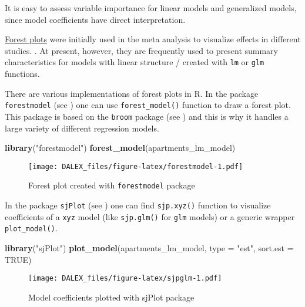 \documentclass[]{book}
\newenvironment{Shaded}{\begin{snugshade}}{\end{snugshade}}
\newcommand{\DataTypeTok}[1]{\textcolor[rgb]{0.13,0.29,0.53}{#1}}
\newcommand{\KeywordTok}[1]{\textcolor[rgb]{0.13,0.29,0.53}{\textbf{#1}}}
\newcommand{\NormalTok}[1]{#1}
\newcommand{\OtherTok}[1]{\textcolor[rgb]{0.56,0.35,0.01}{#1}}
\newcommand{\StringTok}[1]{\textcolor[rgb]{0.31,0.60,0.02}{#1}}
\theoremstyle{definition}
\theoremstyle{definition}
\theoremstyle{definition}
\theoremstyle{remark}
\begin{document}
It is easy to assess variable importance for linear models and
generalized models, since model coefficients have direct interpretation.

\href{https://en.wikipedia.org/wiki/Forest_plot}{Forest plots} were
initially used in the meta analysis to visualize effects in different
studies. . At present, however, they are frequently used to present
summary characteristics for models with linear structure / created with
\texttt{lm} or \texttt{glm} functions.

There are various implementations of forest plots in R. In the package
\texttt{forestmodel} (see \citep{forestmodel}) one can use
\texttt{forest\_model()} function to draw a forest plot. This package is
based on the \texttt{broom} package (see \citep{broom}) and this is why
it handles a large variety of different regression models.

\begin{Shaded}
\begin{Highlighting}[]
\KeywordTok{library}\NormalTok{(}\StringTok{"forestmodel"}\NormalTok{)}
\KeywordTok{forest_model}\NormalTok{(apartments_lm_model)}
\end{Highlighting}
\end{Shaded}

\begin{figure}
\centering
\texttt{[image: DALEX\_files/figure-latex/forestmodel-1.pdf]}
\caption{\label{fig:forestmodel}Forest plot created with
\texttt{forestmodel} package}
\end{figure}

In the package \texttt{sjPlot} (see \citep{sjPlot}) one can find
\texttt{sjp.xyz()} function to visualize coefficients of a \texttt{xyz}
model (like \texttt{sjp.glm()} for \texttt{glm} models) or a generic
wrapper \texttt{plot\_model()}.

\begin{Shaded}
\begin{Highlighting}[]
\KeywordTok{library}\NormalTok{(}\StringTok{"sjPlot"}\NormalTok{)}
\KeywordTok{plot_model}\NormalTok{(apartments_lm_model, }\DataTypeTok{type =} \StringTok{"est"}\NormalTok{, }\DataTypeTok{sort.est =} \OtherTok{TRUE}\NormalTok{)}
\end{Highlighting}
\end{Shaded}

\begin{figure}
\centering
\texttt{[image: DALEX\_files/figure-latex/sjpglm-1.pdf]}
\caption{\label{fig:sjpglm}Model coefficients plotted with sjPlot package}
\end{figure}
\end{document}
